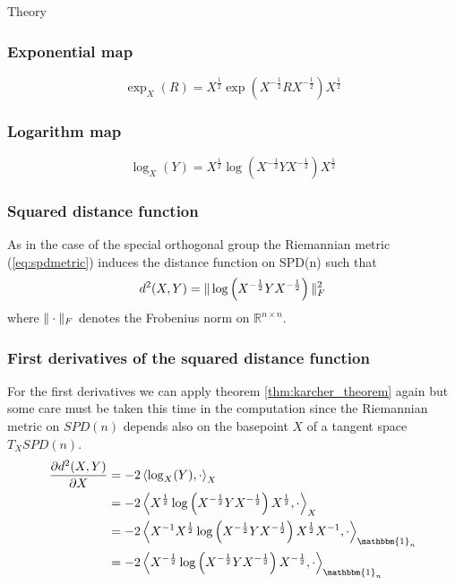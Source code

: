 \begin{chapter}{Theory}
\subsubsection{Exponential map} %
\label{ssub:ExponentialSPD}
\begin{equation}
    \exp_X(R)=X^{\frac{1}{2}}\exp\left(X^{-\frac{1}{2}}RX^{-\frac{1}{2}}\right)X^{\frac{1}{2}}
\end{equation}

\subsubsection{Logarithm map} %
\label{ssub:LogarithmSPD}
\begin{equation}
    \log_X(Y)=X^{\frac{1}{2}}\log\left(X^{-\frac{1}{2}}YX^{-\frac{1}{2}}\right)X^{\frac{1}{2}}
\end{equation}

\subsubsection{Squared distance function} %
\label{ssub:SquareddistanceSPD}
As in the case of the special orthogonal group the Riemannian metric (\ref{eq:spdmetric}) induces the distance function on SPD(n) such that
\begin{equation}
    d^2(X,Y)=\| \log\left(X^{-\frac{1}{2}}YX^{-\frac{1}{2}}\right) \|_F^2
\end{equation}
where $\| \cdot \|_F$ denotes the Frobenius norm on $\mathbb{R}^{n\times n}$.

\subsubsection{First derivatives of the squared distance function} %
\label{ssub:First derivatives of the squared distance function}
For the first derivatives we can apply theorem \ref{thm:karcher_theorem} again but some care must be taken this time in the computation since the Riemannian metric
on $SPD(n)$ depends also on the basepoint $X$ of a tangent space $T_XSPD(n)$.
\begin{align}
    \frac{\partial d^2(X,Y)}{\partial X} &= -2\braket{\log_X(Y),\cdot}_{X}\\
    &= -2 \braket{X^{\frac{1}{2}}\log\left(X^{-\frac{1}{2}}YX^{-\frac{1}{2}}\right)X^{\frac{1}{2}},\cdot}_{X} \\
    &= -2 \braket{X^{-1}X^{\frac{1}{2}}\log\left(X^{-\frac{1}{2}}YX^{-\frac{1}{2}}\right)X^{\frac{1}{2}}X^{-1},\cdot}_{\mathbbm{1}_n} \\
    &= -2 \braket{X^{-\frac{1}{2}}\log\left( X^{-\frac{1}{2}}YX^{-\frac{1}{2}}\right)X^{-\frac{1}{2}},\cdot}_{\mathbbm{1}_n} 
\end{align}


\end{chapter}
